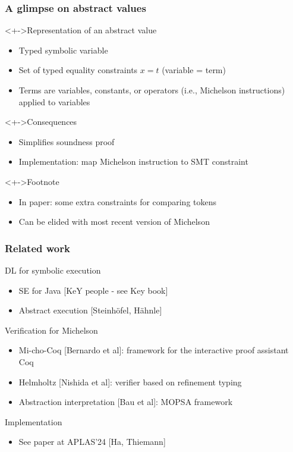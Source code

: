 \documentclass[aspectratio=1610]{beamer}
\begin{document}
\begin{frame}
  \frametitle{A glimpse on abstract values}
  \begin{block}<+->{Representation of an abstract value}
    \begin{itemize}
    \item Typed symbolic variable
    \item Set of typed equality constraints $x = t$ (variable = term)
    \item Terms are variables, constants, or operators (i.e., Michelson instructions) applied to variables
    \end{itemize}
  \end{block}
  \begin{block}<+->{Consequences}
    \begin{itemize}
    \item Simplifies soundness proof
    \item Implementation: map Michelson instruction to SMT constraint
    \end{itemize}
  \end{block}
  \begin{block}<+->{Footnote}
    \begin{itemize}
    \item In paper: some extra constraints for comparing tokens
    \item Can be elided with most recent version of Michelson
    \end{itemize}
  \end{block}
\end{frame}
\begin{frame}
  \frametitle{Related work}
  \begin{block}{DL for symbolic execution}
    \begin{itemize}
    \item SE for Java [KeY people - see Key book]
    \item Abstract execution [Steinh\"{o}fel, H\"{a}hnle]
    \end{itemize}
  \end{block}
  \begin{block}{Verification for Michelson}
    \begin{itemize}
    \item Mi-cho-Coq [Bernardo et al]: framework for the interactive proof assistant Coq
    \item Helmholtz [Nishida et al]: verifier based on refinement typing
    \item Abstraction interpretation [Bau et al]: MOPSA framework
    \end{itemize}
  \end{block}
  \begin{block}{Implementation}
    \begin{itemize}
    \item See paper at APLAS'24 [Ha, Thiemann]
    \end{itemize}
  \end{block}
\end{frame}
\end{document}
